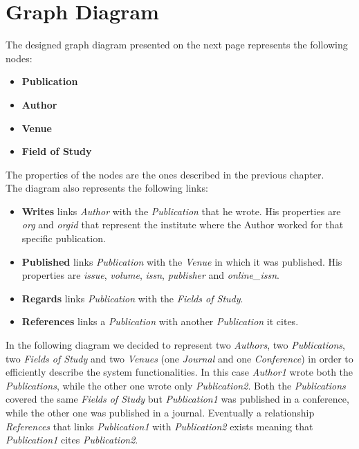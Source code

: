 \documentclass{Configuration_Files/PoliMi3i_thesis}
\begin{document}
\chapter{Graph Diagram}
The designed graph diagram presented on the next page represents the following nodes:
\begin{itemize}
    \item \textbf{Publication}
    \item \textbf{Author}
    \item \textbf{Venue}
    \item \textbf{Field of Study}
\end{itemize}
The properties of the nodes are the ones described in the previous chapter.\\
The diagram also represents the following links:
\begin{itemize}
    \item \textbf{Writes} links \emph{Author} with the \emph{Publication} that he wrote. His properties are \emph{org} and \emph{orgid}
        that represent the institute where the Author worked for that specific publication.
    \item \textbf{Published} links \emph{Publication} with the \emph{Venue} in which it was published. His properties are \emph{issue}, \emph{volume},
        \emph{issn}, \emph{publisher} and \emph{online\_issn}.
    \item \textbf{Regards} links \emph{Publication} with the \emph{Fields of Study}.
    \item \textbf{References} links a \emph{Publication} with another \emph{Publication} it cites.
\end{itemize}
\bigskip
In the following diagram we decided to represent two \emph{Authors}, two \emph{Publications}, two \emph{Fields of Study} and
two \emph{Venues} (one \emph{Journal} and one \emph{Conference}) in order to efficiently describe the system functionalities. \newline
In this case \emph{Author1} wrote both the \emph{Publications}, while the other one wrote only \emph{Publication2}.
Both the \emph{Publications} covered the same \emph{Fields of Study} but \emph{Publication1} was published in a conference,
while the other one was published in a journal. Eventually a relationship \emph{References} that
links \emph{Publication1} with \emph{Publication2} exists meaning that \emph{Publication1} cites \emph{Publication2}.
\end{document}

